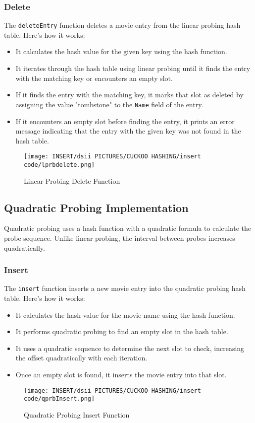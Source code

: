 \documentclass[12pt]{article}
\begin{document}
\newpage

\subsubsection{Delete}
The \texttt{deleteEntry} function deletes a movie entry from the linear probing hash table. Here's how it works:
\begin{itemize}
    \item It calculates the hash value for the given key using the hash function.
    \item It iterates through the hash table using linear probing until it finds the entry with the matching key or encounters an empty slot.
    \item If it finds the entry with the matching key, it marks that slot as deleted by assigning the value "tombstone" to the \texttt{Name} field of the entry.
    \item If it encounters an empty slot before finding the entry, it prints an error message indicating that the entry with the given key was not found in the hash table.
\end{itemize}

\begin{figure}[htbp]
    \centering
    \texttt{[image: INSERT/dsii PICTURES/CUCKOO HASHING/insert code/lprbdelete.png]}
    \caption{Linear Probing Delete Function}
    \label{fig:insertion_step1}
\end{figure}

\newpage


\subsection{Quadratic Probing Implementation}
Quadratic probing uses a hash function with a quadratic formula to calculate the probe sequence. Unlike linear probing, the interval between probes increases quadratically.

\subsubsection{Insert}
The \texttt{insert} function inserts a new movie entry into the quadratic probing hash table. Here's how it works:
\begin{itemize}
    \item It calculates the hash value for the movie name using the hash function.
    \item It performs quadratic probing to find an empty slot in the hash table.
    \item It uses a quadratic sequence to determine the next slot to check, increasing the offset quadratically with each iteration.
    \item Once an empty slot is found, it inserts the movie entry into that slot.
\end{itemize}
\begin{figure}[htbp]
    \centering
    \texttt{[image: INSERT/dsii PICTURES/CUCKOO HASHING/insert code/qprbInsert.png]}
    \caption{Quadratic Probing Insert Function}
    \label{fig:insertion_step1}
\end{figure}
\newpage
\end{document}
